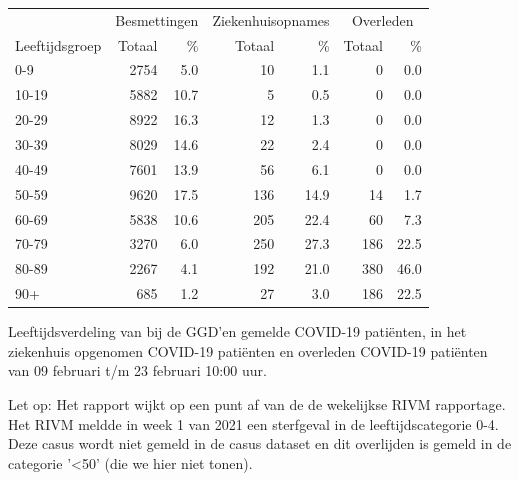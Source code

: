 \documentclass[
  english,
  man,floatsintext]{apa6}
\begin{document}
\begin{table}[H]
\centering\begingroup\fontsize{11}{13}\selectfont

\begin{threeparttable}
\begin{tabular}{lrrrrrr}
\toprule
\multicolumn{1}{c}{ } & \multicolumn{2}{c}{Besmettingen} & \multicolumn{2}{c}{Ziekenhuisopnames} & \multicolumn{2}{c}{Overleden} \\
\cmidrule(l{3pt}r{3pt}){2-3} \cmidrule(l{3pt}r{3pt}){4-5} \cmidrule(l{3pt}r{3pt}){6-7}
Leeftijdsgroep & Totaal & \% & Totaal & \% & Totaal & \%\\
\midrule
0-9 & 2754 & 5.0 & 10 & 1.1 & 0 & 0.0\\
10-19 & 5882 & 10.7 & 5 & 0.5 & 0 & 0.0\\
20-29 & 8922 & 16.3 & 12 & 1.3 & 0 & 0.0\\
30-39 & 8029 & 14.6 & 22 & 2.4 & 0 & 0.0\\
40-49 & 7601 & 13.9 & 56 & 6.1 & 0 & 0.0\\
50-59 & 9620 & 17.5 & 136 & 14.9 & 14 & 1.7\\
60-69 & 5838 & 10.6 & 205 & 22.4 & 60 & 7.3\\
70-79 & 3270 & 6.0 & 250 & 27.3 & 186 & 22.5\\
80-89 & 2267 & 4.1 & 192 & 21.0 & 380 & 46.0\\
90+ & 685 & 1.2 & 27 & 3.0 & 186 & 22.5\\
\bottomrule
\end{tabular}
\begin{tablenotes}
\item[1] Leeftijdsverdeling van bij de GGD’en gemelde COVID-19 patiënten, in het ziekenhuis opgenomen COVID-19 patiënten en overleden COVID-19 patiënten van 09 februari t/m 23 februari 10:00 uur.
\item[2] Let op: Het rapport wijkt op een punt af van de de wekelijkse RIVM rapportage. Het RIVM meldde in week 1 van 2021 een sterfgeval in de leeftijdscategorie 0-4. Deze casus wordt niet gemeld in de casus dataset en dit overlijden is gemeld in de categorie '<50' (die we hier niet tonen).
\end{tablenotes}
\end{threeparttable}
\endgroup{}
\end{table}

\newpage
\end{document}
